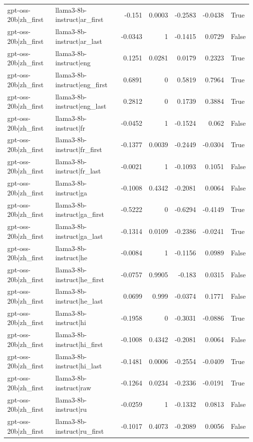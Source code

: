 \begin{table}
\begin{tabular}{l l r r r r l}
gpt-oss-20b|zh_first & llama3-8b-instruct|ar_first & -0.151 & 0.0003 & -0.2583 & -0.0438 & True \\
gpt-oss-20b|zh_first & llama3-8b-instruct|ar_last & -0.0343 & 1 & -0.1415 & 0.0729 & False \\
gpt-oss-20b|zh_first & llama3-8b-instruct|eng & 0.1251 & 0.0281 & 0.0179 & 0.2323 & True \\
gpt-oss-20b|zh_first & llama3-8b-instruct|eng_first & 0.6891 & 0 & 0.5819 & 0.7964 & True \\
gpt-oss-20b|zh_first & llama3-8b-instruct|eng_last & 0.2812 & 0 & 0.1739 & 0.3884 & True \\
gpt-oss-20b|zh_first & llama3-8b-instruct|fr & -0.0452 & 1 & -0.1524 & 0.062 & False \\
gpt-oss-20b|zh_first & llama3-8b-instruct|fr_first & -0.1377 & 0.0039 & -0.2449 & -0.0304 & True \\
gpt-oss-20b|zh_first & llama3-8b-instruct|fr_last & -0.0021 & 1 & -0.1093 & 0.1051 & False \\
gpt-oss-20b|zh_first & llama3-8b-instruct|ga & -0.1008 & 0.4342 & -0.2081 & 0.0064 & False \\
gpt-oss-20b|zh_first & llama3-8b-instruct|ga_first & -0.5222 & 0 & -0.6294 & -0.4149 & True \\
gpt-oss-20b|zh_first & llama3-8b-instruct|ga_last & -0.1314 & 0.0109 & -0.2386 & -0.0241 & True \\
gpt-oss-20b|zh_first & llama3-8b-instruct|he & -0.0084 & 1 & -0.1156 & 0.0989 & False \\
gpt-oss-20b|zh_first & llama3-8b-instruct|he_first & -0.0757 & 0.9905 & -0.183 & 0.0315 & False \\
gpt-oss-20b|zh_first & llama3-8b-instruct|he_last & 0.0699 & 0.999 & -0.0374 & 0.1771 & False \\
gpt-oss-20b|zh_first & llama3-8b-instruct|hi & -0.1958 & 0 & -0.3031 & -0.0886 & True \\
gpt-oss-20b|zh_first & llama3-8b-instruct|hi_first & -0.1008 & 0.4342 & -0.2081 & 0.0064 & False \\
gpt-oss-20b|zh_first & llama3-8b-instruct|hi_last & -0.1481 & 0.0006 & -0.2554 & -0.0409 & True \\
gpt-oss-20b|zh_first & llama3-8b-instruct|raw & -0.1264 & 0.0234 & -0.2336 & -0.0191 & True \\
gpt-oss-20b|zh_first & llama3-8b-instruct|ru & -0.0259 & 1 & -0.1332 & 0.0813 & False \\
gpt-oss-20b|zh_first & llama3-8b-instruct|ru_first & -0.1017 & 0.4073 & -0.2089 & 0.0056 & False \\

\end{tabular}
\end{table}
